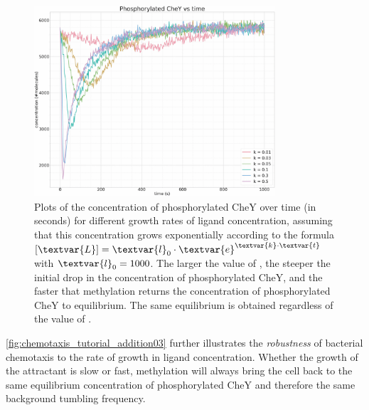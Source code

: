 \begin{figure}[h]
\centering
\mySfFamily
\includegraphics[width = 0.8\textwidth]{../images_CMYK/chemotaxis_tutorial_addition03}
\caption{Plots of the concentration of phosphorylated CheY over time (in seconds) for different growth rates  of ligand concentration, assuming that this concentration grows exponentially according to the formula  $[\textvar{L}] = \textvar{l}_\text{0} \cdot \textvar{e}^{\textvar{k} \cdot \textvar{t}}$ with $\textvar{l}_\text{0} = \text{1000}$. The larger the value of , the steeper the initial drop in the concentration of phosphorylated CheY, and the faster that methylation returns the concentration of phosphorylated CheY to equilibrium. The same equilibrium is obtained regardless of the value of .}
\label{fig:chemotaxis_tutorial_addition03}
\end{figure}

\autoref{fig:chemotaxis_tutorial_addition03} further illustrates the \textit{robustness} of bacterial chemotaxis to the rate of growth in ligand concentration. Whether the growth of the attractant is slow or fast, methylation will always bring the cell back to the same equilibrium concentration of phosphorylated CheY and therefore the same background tumbling frequency.\\

\begin{qbox}\end{qbox}

